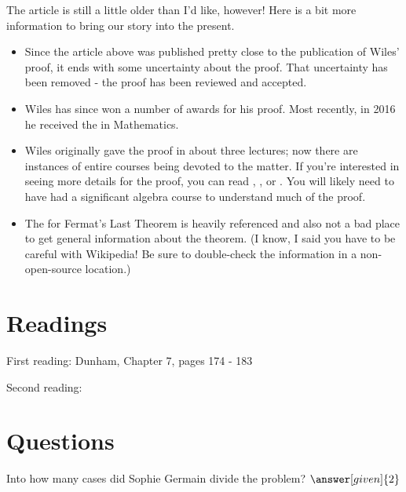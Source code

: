 \documentclass[nooutcomes]{ximera}
\begin{document}
The article is still a little older than I'd like, however!  Here is a bit more information to bring our story into the present.
\begin{itemize}
	\item Since the article above was published pretty close to
          the publication of Wiles' proof, it ends with some
          uncertainty about the proof.  That uncertainty has been
          removed - the proof has been reviewed and accepted.
	\item Wiles has since won a number of awards for his proof.  Most recently, in 2016 he received the  in Mathematics.  
	\item Wiles originally gave the proof in about three lectures; now there are instances of entire courses being devoted to the matter.  If you're interested in seeing more details for the proof, you can read , , or .  You will likely need to have had a significant algebra course to understand much of the proof.
	\item The  for Fermat's Last Theorem is heavily referenced and also not a bad place to get general information about the theorem.  (I know, I said you have to be careful with Wikipedia!  Be sure to double-check the information in a non-open-source location.)
\end{itemize}

\section{Readings}
First reading: Dunham, Chapter 7, pages 174 - 183

Second reading: 



\section{Questions}

\begin{question}
Into how many cases did Sophie Germain divide the problem? $\answer[given]{2}$
\end{question}
\end{document}
